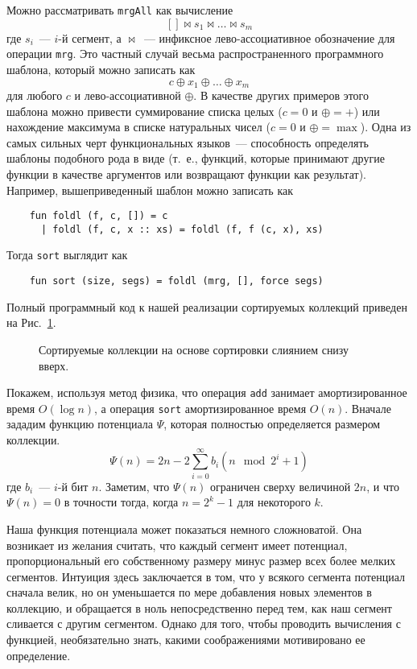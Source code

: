 \begin{remark}
  Можно рассматривать \lstinline!mrgAll! как вычисление
  $$
  [] \bowtie s_1 \bowtie \ldots \bowtie s_m
  $$
  где $s_i$~--- $i$-й сегмент, а $\bowtie$~--- инфиксное
  лево-ассоциативное обозначение для операции \lstinline!mrg!. Это частный случай весьма
  распространенного программного шаблона, который можно записать как
  $$
  c \oplus x_1 \oplus \ldots \oplus x_m
  $$
  для любого $c$ и лево-ассоциативной $\oplus$. В качестве других
  примеров этого шаблона можно привести суммирование списка целых ($c
  = 0$ и $\oplus = +$) или нахождение максимума в списке натуральных
  чисел ($c = 0$ и $\oplus = \max$). Одна из самых сильных черт
  функциональных языков~--- способность определять шаблоны подобного
  рода в виде 
  (т.~е., функций, которые принимают другие функции в качестве
  аргументов или возвращают функции как результат). Например,
  вышеприведенный шаблон можно записать как
  \begin{lstlisting}
    fun foldl (f, c, []) = c
      | foldl (f, c, x :: xs) = foldl (f, f (c, x), xs)
  \end{lstlisting}
  Тогда \lstinline!sort! выглядит как
  \begin{lstlisting}
    fun sort (size, segs) = foldl (mrg, [], force segs)
  \end{lstlisting}
\end{remark}
Полный программный код к нашей реализации сортируемых коллекций
приведен на Рис.~\ref{fig:6.5}.

\begin{figure}
  \centering
  
  \caption{Сортируемые коллекции на основе сортировки слиянием снизу вверх.}
  \label{fig:6.5}
\end{figure}

Покажем, используя метод физика, что операция \lstinline!add! занимает
амортизированное время $O(\log n)$, а операция \lstinline!sort!
амортизированное время $O(n)$.  Вначале зададим функцию потенциала
$\Psi$, которая полностью определяется размером коллекции.
$$
\Psi(n) = 2n - 2 \sum_{i=0}^{\infty} b_i (n \mod 2^i+1)
$$
где $b_i$~--- $i$-й бит $n$. Заметим, что $\Psi(n)$ ограничен сверху
величиной $2n$, и что $\Psi(n) = 0$ в точности тогда, когда $n = 2^k -
1$ для некоторого $k$.

\begin{remark}
  Наша функция потенциала может показаться немного сложноватой. Она
  возникает из желания считать, что каждый сегмент имеет потенциал,
  пропорциональный его собственному размеру минус размер всех более
  мелких сегментов. Интуиция здесь заключается в том, что у всякого
  сегмента потенциал сначала велик, но он уменьшается по мере
  добавления новых элементов в коллекцию, и обращается в ноль
  непосредственно перед тем, как наш сегмент сливается с другим
  сегментом. Однако для того, чтобы проводить вычисления с функцией,
  необязательно знать, какими соображениями мотивировано ее
  определение. 
\end{remark}

